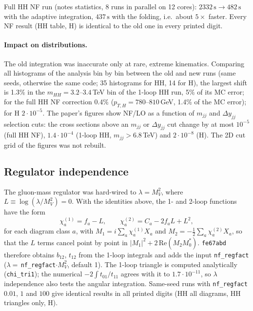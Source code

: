 \documentclass[11pt,a4paper]{article}
\newcommand{\commit}[1]{\texttt{#1}}
\newcommand{\MV}{M_V}
\begin{document}
\noindent Full HH NF run (notes statistics, 8 runs in parallel on 12
cores): $2332\,\mathrm{s}\to482\,\mathrm{s}$ with the adaptive
integration, $437\,\mathrm{s}$ with the folding, i.e.\ about $5\times$
faster. Every NF result (HH table, H) is identical to the old one in
every printed digit.

\paragraph{Impact on distributions.} The old integration was
inaccurate only at rare, extreme kinematics. Comparing all histograms
of the analysis bin by bin between the old and new runs (same seeds,
otherwise the same code; 35 histograms for HH, 14 for H), the largest
shift is 1.3\% in the $m_{HH}=3.2$--$3.4$\,TeV bin of the 1-loop HH
run, 5\% of its MC error; for the full HH NF correction 0.4\%
($p_{T,H}=780$--$810$\,GeV, 1.4\% of the MC error); for H
$2\cdot10^{-5}$. The paper's figures show NF/LO as a function of
$m_{jj}$ and $\Delta y_{jj}$ selection cuts: the cross sections above
an $m_{jj}$ or $\Delta y_{jj}$ cut change by at most $10^{-5}$ (full HH
NF), $1.4\cdot10^{-4}$ (1-loop HH, $m_{jj}>6.8$\,TeV) and
$2\cdot10^{-8}$ (H). The 2D cut grid of the figures was not rebuilt.

\subsection{Regulator independence}

The gluon-mass regulator was hard-wired to $\lambda=\MV^2$, where
$L\equiv\log(\lambda/\MV^2)=0$. With the identities above, the 1- and
2-loop functions have the form
\begin{equation}
  \chi^{(1)}_a = f_a - L,\qquad \chi^{(2)}_a = C_a - 2f_aL + L^2,
\end{equation}
for each diagram class $a$, with $M_1=i\sum_a\chi^{(1)}_aX_a$ and
$M_2=-\frac12\sum_a\chi^{(2)}_aX_a$, so that the $L$ terms cancel point
by point in $|M_1|^2+2\,\mathrm{Re}(M_2M_0^*)$. \commit{fe67abd}
therefore obtains $b_{12}$, $t_{12}$ from the 1-loop integrals and adds
the input \texttt{nf\_regfact} ($\lambda=$\,\texttt{nf\_regfact}$\cdot\MV^2$,
default 1). The 1-loop triangle is computed analytically
(\texttt{chi\_tri1}); the numerical $-2\int t_{01}/t_{11}$ agrees with it
to $1.7\cdot10^{-11}$, so $\lambda$ independence also tests the
angular integration. Same-seed runs with \texttt{nf\_regfact}
$0.01$, $1$ and $100$ give identical results in all printed digits (HH
all diagrams, HH triangles only, H).
\end{document}
